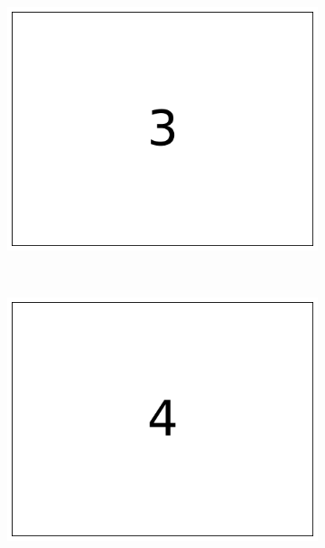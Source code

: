 \begin{figure}[H]
\begin{subfigure}{.15\textwidth}
    \includegraphics[width=\linewidth]{figures/layout_3.pdf}
\end{subfigure}
\\
\begin{subfigure}{.15\textwidth}
    \centering
    \includegraphics[width=\linewidth]{figures/layout_4.pdf}
\end{subfigure}
%
\begin{subfigure}{.15\textwidth}
    \centering

\end{subfigure}
\end{figure}
